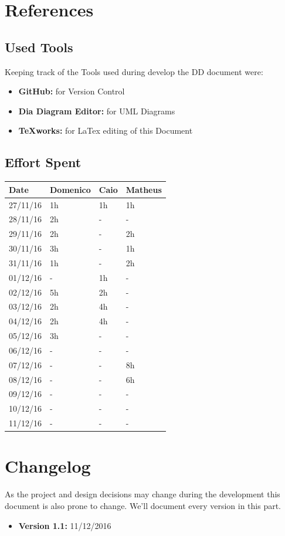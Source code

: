 \documentclass[a4paper]{article}
\begin{document}
\newpage

\section{References}
\subsection{Used Tools}
Keeping track of the Tools used during develop the DD document were:
\begin{itemize}
	\item \textbf{GitHub:} for Version Control
	\item \textbf {Dia Diagram Editor:} for UML Diagrams
	\item \textbf {TeXworks:} for LaTex editing of this Document
\end{itemize}
\newpage
\subsection{Effort Spent}
\begin{tabular}{ | l | l | l | l | }
\hline
	\textbf {Date} & \textbf {Domenico} & \textbf {Caio} & \textbf {Matheus} \\ \hline
	27/11/16& 1h & 1h & 1h  \\ \hline
	28/11/16& 2h & - & - \\ \hline
	29/11/16& 2h & - & 2h\\ \hline
	30/11/16& 3h & - & 1h\\ \hline
	31/11/16& 1h & - & 2h\\ \hline
	01/12/16& - & 1h & - \\ \hline
	02/12/16& 5h & 2h & - \\ \hline
	03/12/16& 2h & 4h & - \\ \hline
	04/12/16& 2h & 4h & - \\ \hline
	05/12/16& 3h & - & - \\ \hline
	06/12/16& - & - & - \\ \hline
	07/12/16& - & - & 8h\\ \hline
	08/12/16& - & - & 6h\\ \hline
	09/12/16& - & - & - \\ \hline
	10/12/16& - & - & - \\ \hline
	11/12/16& - & - & - \\ \hline
\end{tabular}
\newpage

\section{Changelog}
As the project and design decisions may change during the development this document is also prone to change.
We'll document every version in this part.
\begin{itemize}
\item \textbf {Version 1.1:} 11/12/2016
\end{itemize}
\end{document}
